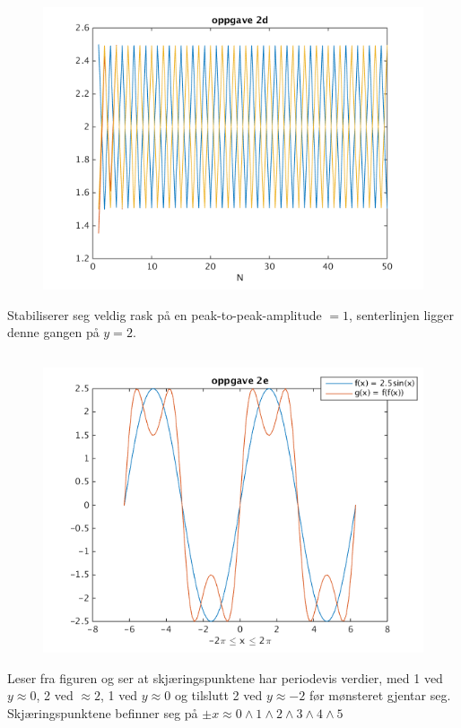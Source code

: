 \documentclass[11pt]{article}
\begin{document}
	\subsection*{}
		\begin{figure}[H]
			\includegraphics[width=13cm]{oppg2d}
		\end{figure}
		\noindent Stabiliserer seg veldig rask på en peak-to-peak-amplitude $ = 1$, senterlinjen ligger denne gangen på $y = 2$.
	\subsection*{}
		\begin{figure}[H]
			\includegraphics[width=13cm]{oppg2e}
		\end{figure}
		\noindent Leser fra figuren og ser at skjæringspunktene har periodevis verdier, med 1 ved $y\approx0$, 2 ved $\approx2$, 1 ved $y\approx0$ og tilslutt 2 ved $y\approx-2$ før mønsteret gjentar seg. Skjæringspunktene befinner seg på $\pm x\approx0\wedge1\wedge2\wedge3\wedge4\wedge5$
\end{document}
